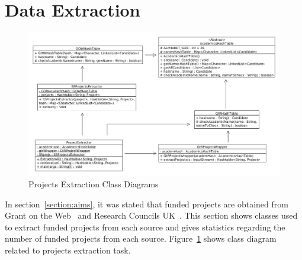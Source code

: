 \section{Data Extraction}\label{sec:dataextraction}
\begin{figure}
\centering
\includegraphics[scale=0.35]{./figures/projectsExtraction.png}
\caption{Projects Extraction Class Diagrams} \label{fig:projectsExtraction} 
\end{figure}
In section~\ref{section:aims}, it was stated that funded projects are obtained from Grant on the Web~\cite{gow} and Research Councils UK~\cite{gtr}.
This section shows classes used to extract funded projects from each source and gives statistics regarding the number of funded projects from each source.
Figure~\ref{fig:projectsExtraction} shows class diagram related to projects extraction task.

